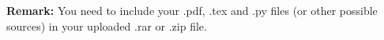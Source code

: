 \documentclass[12pt,a4paper]{article}
\theoremstyle{definition}
\begin{document}
\vspace{20pt}

\textbf{Remark:} You need to include your .pdf, .tex and .py files (or other possible sources) in your uploaded .rar or .zip file.

\end{document}
